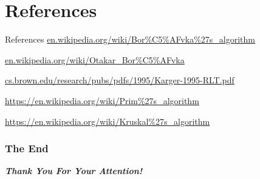 \documentclass[
	11pt, %
]{beamer}
\begin{document}
\section{References}
\begin{frame}
    \tableofcontentscurrent
\end{frame}

\begin{frame}{References}
    \bullet \url{en.wikipedia.org/wiki/Bor\%C5\%AFvka\%27s\_algorithm}

    \bullet \url{en.wikipedia.org/wiki/Otakar\_Bor\%C5\%AFvka}

    \bullet \url{cs.brown.edu/research/pubs/pdfs/1995/Karger-1995-RLT.pdf}

    \bullet \url{https://en.wikipedia.org/wiki/Prim\%27s\_algorithm}

    \bullet \url{https://en.wikipedia.org/wiki/Kruskal\%27s\_algorithm}
\end{frame}

\begin{frame}
    \frametitle{The End}
    \begin{center}
        \textbf{\huge{\emph{Thank You For Your Attention!}}}  
    \end{center}
\end{frame}
\end{document}
